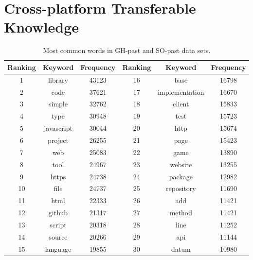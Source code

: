         
    
    \section{Cross-platform Transferable Knowledge}
    
        \begin{table}
          \centering
          \caption{Most common words in GH-past and SO-past data sets.}\label{tab:RQ3_past}
            \vspace{6pt} %
          \begin{tabular}{|c c c | c c c|}
            \hline
            Ranking & Keyword & Frequency & Ranking & Keyword & Frequency \\
            \hline\hline
            1 & library & 43123 & 16 & base & 16798 \\
            2 & code & 37621 & 17 & implementation & 16670 \\
            3 & simple & 32762 & 18 & client & 15833 \\
            4 & type & 30948 & 19 & test & 15723 \\
            5 & javascript & 30044 & 20 & http & 15674 \\
            6 & project & 26255 & 21 & page & 15423 \\
            7 & web & 25083 & 22 & game & 13890 \\
            8 & tool & 24967 & 23 & website & 13255 \\
            9 & https & 24738 & 24 & package & 12982 \\
            10 & file & 24737 & 25 & repository & 11690 \\
            11 & html & 22333 & 26 & add & 11421 \\
            12 & github & 21317 & 27 & method & 11421 \\
            13 & script & 20318 & 28 & line & 11252 \\
            14 & source & 20266 & 29 & api & 11144 \\
            15 & language & 19855 & 30 & datum & 10980 \\
            \hline
          \end{tabular}
        \end{table}
        
